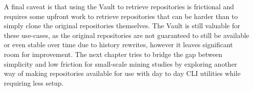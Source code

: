 A final caveat is that using the Vault to retrieve repositories is frictional
and requires some upfront work to retrieve repositories that can be harder than
to simply clone the original repositories themselves. The Vault is still
valuable for these use-cases, as the original repositories are not guaranteed to
still be available or even stable over time due to history rewrites, however it
leaves significant room for improvement.  The next chapter tries to bridge the
gap between simplicity and low friction for small-scale mining studies by
exploring another way of making repositories available for use with day to day
CLI utilities while requiring less setup.

